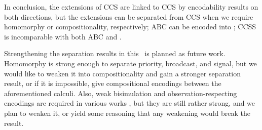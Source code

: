 \documentclass[adraft,hidelinks]{eptcs}
\begin{document}
In conclusion, the extensions of CCS are linked to CCS by encodability results on both directions, but the extensions can be separated from CCS when we require homomorphy or compositionality, respectively; ABC can be encoded into \CSG; CCSS is incomparable with both ABC and \CSG.

Strengthening the separation results in this \this\ is planned as future work.
Homomorphy is strong enough to separate priority, broadcast, and signal, but we would like to weaken it into compositionality and gain a stronger separation result, or if it is impossible, give compositional encodings between the aforementioned calculi.
Also, weak bisimulation and observation-respecting encodings are required in various works \cite{EM99, CTJ94, IP08, VBG09}, but they are still rather strong, and we plan to weaken it, or yield some reasoning that any weakening would break the result.




\end{document}
